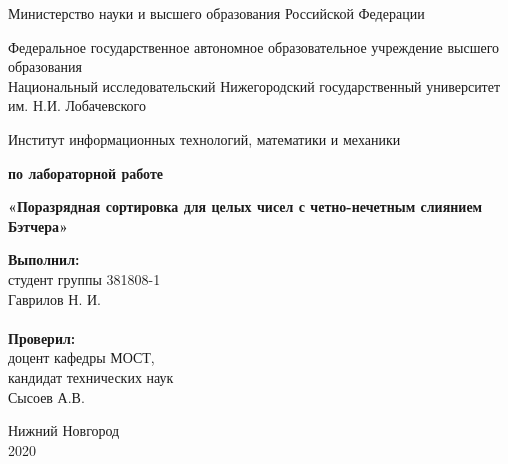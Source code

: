 \documentclass{report}
\begin{document}
\begin{titlepage}

\begin{center}
Министерство науки и высшего образования Российской Федерации
\end{center}

\begin{center}
Федеральное государственное автономное образовательное учреждение высшего образования \\
Национальный исследовательский Нижегородский государственный университет им. Н.И. Лобачевского
\end{center}

\begin{center}
Институт информационных технологий, математики и механики
\end{center}

\vspace{4em}

\begin{center}
\textbf{ по лабораторной работе} \\
\end{center}
\begin{center}
\textbf{\Large«Поразрядная сортировка для целых чисел с четно-нечетным слиянием Бэтчера»} \\
\end{center}

\vspace{4em}

\newbox{\lbox}
\newlength{\maxl}
\setlength{\maxl}{\wd\lbox}
\hfill\parbox{7cm}{
\hspace*{5cm}\hspace*{-5cm}\textbf{Выполнил:} \\ студент группы 381808-1 \\ Гаврилов Н. И.\\
\\
\hspace*{5cm}\hspace*{-5cm}\textbf{Проверил:}\\ доцент кафедры МОСТ, \\ кандидат технических наук \\ Сысоев А.В.\\
}
\vspace{\fill}

\begin{center} Нижний Новгород \\ 2020 \end{center}

\end{titlepage}
\end{document}
